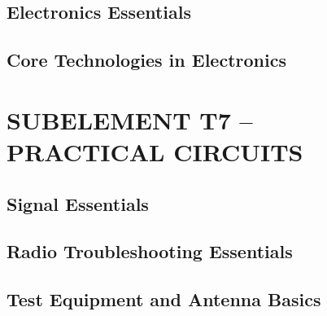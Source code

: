 \documentclass[12pt]{book}
\begin{document}
\section{Electronics Essentials}












\section{Core Technologies in Electronics}











\chapter{SUBELEMENT T7 – PRACTICAL CIRCUITS}
\section{Signal Essentials}











\section{Radio Troubleshooting Essentials}











\section{Test Equipment and Antenna Basics}











\end{document}
